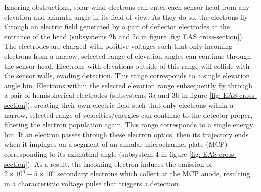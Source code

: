 Ignoring obstructions, solar wind electrons can enter each sensor head from any elevation and azimuth angle in its field of view. As they do so, the electrons fly through an electric field generated by a pair of deflector electrodes at the entrance of the head (subsystems 2b and 2c in figure \ref{fig: EAS cross-section}). The electrodes are charged with positive voltages such that only incoming electrons from a narrow, selected range of elevation angles can continue through the sensor head. Electrons with elevations outside of this range will collide with the sensor walls, evading detection. This range corresponds to a single elevation angle bin. Electrons within the selected elevation range subsequently fly through a pair of hemispherical electrodes (subsystems 3a and 3b in figure \ref{fig: EAS cross-section}), creating their own electric field such that only electrons within a narrow, selected range of velocities/energies can continue to the detector proper, filtering the electron population again. This range corresponds to a single energy bin. If an electron passes through these electron optics, then its trajectory ends when it impinges on a segment of an annular microchannel plate (MCP) corresponding to its azimuthal angle (subsystem 4 in figure \ref{fig: EAS cross-section}). As a result, the incoming electron induces the emission of \(2\times10^{6}-5\times10^{6}\) secondary electrons which collect at the MCP anode, resulting in a characteristic voltage pulse that triggers a detection\cite{owen2020}.
\\

